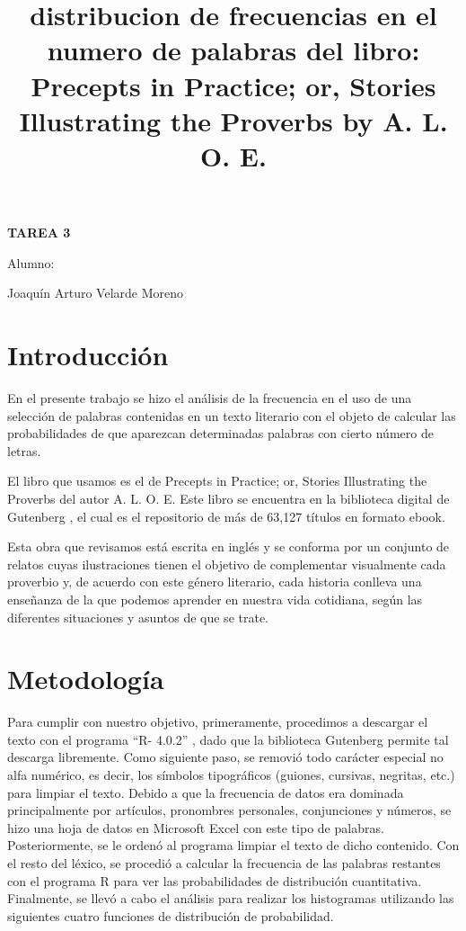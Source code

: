 \documentclass[]{article}
\title{distribucion de frecuencias en el numero de palabras del libro:
 Precepts in Practice; or, Stories Illustrating the Proverbs by A. L. O. E. }
\date{}
\begin{document}
	\maketitle
	\begin{center}


\centerline{\textbf{TAREA 3} } 
\textbf{ }

\centerline{Alumno: } 
\centerline{Joaquín Arturo Velarde Moreno}


	\end{center}
	

\section{Introducción}
En el presente trabajo se hizo el análisis de la frecuencia en el uso de una selección de palabras contenidas en un texto literario con el objeto de calcular las probabilidades de que aparezcan determinadas palabras con cierto número de letras.

El libro que usamos es el de Precepts in Practice; or, Stories Illustrating the Proverbs del autor A. L. O. E.  \cite{proverbs} 
Este libro se encuentra en la biblioteca digital de Gutenberg  \cite{guten},  el cual es el repositorio de más de 63,127 títulos en formato ebook.

Esta obra que revisamos está escrita en inglés y se conforma por un conjunto de relatos cuyas ilustraciones tienen el objetivo de complementar visualmente cada proverbio y, de acuerdo con este género literario, cada historia conlleva una enseñanza de la que podemos aprender en nuestra vida cotidiana, según las diferentes situaciones y asuntos de que se trate.



\section{Metodología}
Para cumplir con nuestro objetivo, primeramente, procedimos a descargar el texto con el programa “R- 4.0.2” \cite{rproject} , dado que la biblioteca Gutenberg \cite{guten} permite tal descarga libremente.
Como siguiente paso, se removió todo carácter especial no alfa numérico, es decir, los símbolos tipográficos (guiones, cursivas, negritas, etc.) para limpiar el texto.
Debido a que la frecuencia de datos era dominada principalmente por artículos, pronombres personales, conjunciones y números, se hizo una hoja de datos en Microsoft Excel \cite{excel} con este tipo de palabras. Posteriormente, se le ordenó al programa limpiar el texto de dicho contenido.
Con el resto del léxico, se procedió a calcular la frecuencia de las palabras restantes con el programa R para ver las probabilidades de distribución cuantitativa.
Finalmente, se llevó a cabo el análisis para realizar los histogramas utilizando las siguientes cuatro funciones de distribución de probabilidad.
\end{document}
